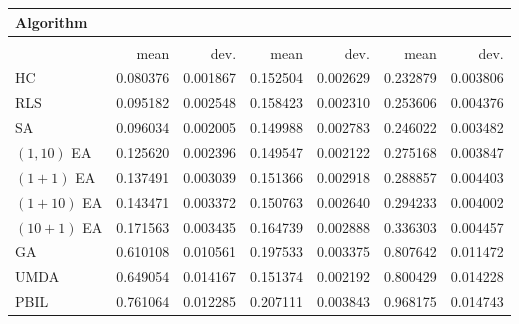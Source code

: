 \begin{tabular}{@{} l *{6}{>{{}}N{1}{2}} @{}}
\toprule
{Algorithm} &  \\
\midrule
&  &  &  \\
\midrule
& {mean} & {dev.} & {mean} & {dev.} & {mean} & {dev.} \\
\midrule
HC & 0.080376 & 0.001867 & 0.152504 & 0.002629 & 0.232879 & 0.003806 \\
RLS & 0.095182 & 0.002548 & 0.158423 & 0.002310 & 0.253606 & 0.004376 \\
SA & 0.096034 & 0.002005 & 0.149988 & 0.002783 & 0.246022 & 0.003482 \\
$(1,10)$ EA & 0.125620 & 0.002396 & 0.149547 & 0.002122 & 0.275168 & 0.003847 \\
$(1+1)$ EA & 0.137491 & 0.003039 & 0.151366 & 0.002918 & 0.288857 & 0.004403 \\
$(1+10)$ EA & 0.143471 & 0.003372 & 0.150763 & 0.002640 & 0.294233 & 0.004002 \\
$(10+1)$ EA & 0.171563 & 0.003435 & 0.164739 & 0.002888 & 0.336303 & 0.004457 \\
GA & 0.610108 & 0.010561 & 0.197533 & 0.003375 & 0.807642 & 0.011472 \\
UMDA & 0.649054 & 0.014167 & 0.151374 & 0.002192 & 0.800429 & 0.014228 \\
PBIL & 0.761064 & 0.012285 & 0.207111 & 0.003843 & 0.968175 & 0.014743 \\
\bottomrule
\end{tabular}
